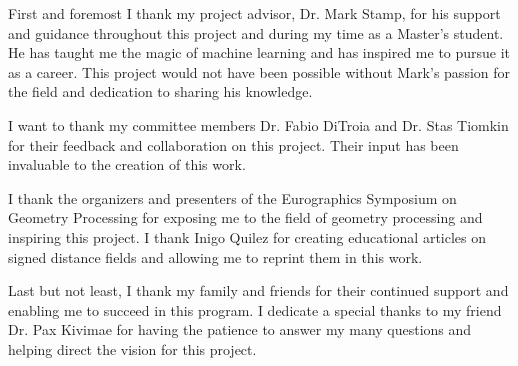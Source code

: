 
First and foremost I thank my project advisor, Dr. Mark Stamp, for his support and guidance throughout this project and during my time as a Master's student. He has taught me the magic of machine learning and has inspired me to pursue it as a career. This project would not have been possible without Mark's passion for the field and dedication to sharing his knowledge.

I want to thank my committee members Dr. Fabio DiTroia and Dr. Stas Tiomkin for their feedback and collaboration on this project. Their input has been invaluable to the creation of this work.

I thank the organizers and presenters of the Eurographics Symposium on Geometry Processing for exposing me to the field of geometry processing and inspiring this project. I thank Inigo Quilez for creating educational articles on signed distance fields and allowing me to reprint them in this work.

Last but not least, I thank my family and friends for their continued support and enabling me to succeed in this program. I dedicate a special thanks to my friend Dr. Pax Kivimae for having the patience to answer my many questions and helping direct the vision for this project.